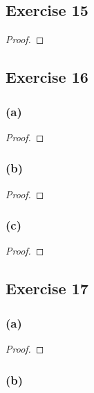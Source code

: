 \documentclass[14pt]{extarticle}
\begin{document}
\subsection{Exercise 15}

\begin{proof}

\end{proof}

\subsection{Exercise 16}

\subsubsection{(a)}

\begin{proof}

\end{proof}

\subsubsection{(b)}

\begin{proof}

\end{proof}

\subsubsection{(c)}

\begin{proof}

\end{proof}

\subsection{Exercise 17}

\subsubsection{(a)}

\begin{proof}

\end{proof}

\subsubsection{(b)}
\end{document}
